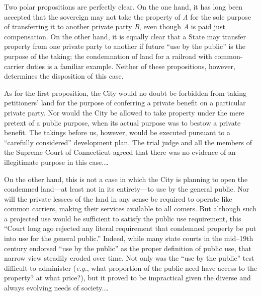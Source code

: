 
Two polar propositions are perfectly clear. On the one hand, it has long been
accepted that the sovereign may not take the property of \textit{A} for the sole
purpose of transferring it to another private party \textit{B}, even though
\textit{A} is paid just compensation. On the other hand, it is equally clear
that a State may transfer property from one private party to another if future
``use by the public'' is the purpose of the taking; the condemnation of land for
a railroad with common-carrier duties is a familiar example. Neither of these
propositions, however, determines the disposition of this case.

As for the first proposition, the City would no doubt be forbidden from taking
petitioners' land for the purpose of conferring a private benefit on a
particular private party. Nor would the City be allowed to take property under
the mere pretext of a public purpose, when its actual purpose was to bestow a
private benefit. The takings before us, however, would be executed pursuant to a
``carefully considered'' development plan. The trial judge and all the members
of the Supreme Court of Connecticut agreed that there was no evidence of an
illegitimate purpose in this case.\ldots

On the other hand, this is not a case in which the City is planning to open the
condemned land---at least not in its entirety---to use by the general public.
Nor will the private lessees of the land in any sense be required to operate
like common carriers, making their services available to all comers. But
although such a projected use would be sufficient to satisfy the public use
requirement, this ``Court long ago rejected any literal requirement that
condemned property be put into use for the general public.''
Indeed, while many state courts in the mid--19th century
endorsed ``use by the public'' as the proper definition of public use, that
narrow view steadily eroded over time. Not only was the ``use by the public''
test difficult to administer (\textit{e.g.}, what proportion of the public need
have access to the property? at what price?), but it proved to be impractical
given the diverse and always evolving needs of society.\ldots

